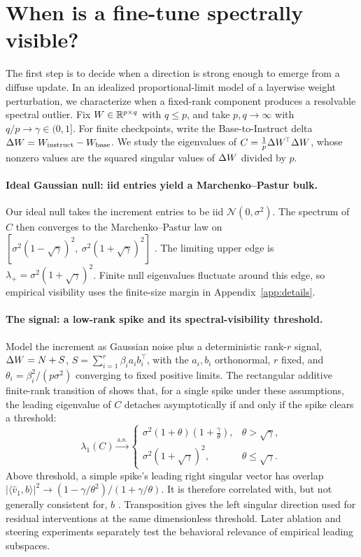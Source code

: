 \section{When is a fine-tune spectrally visible?}
\label{sec:theory}

The first step is to decide when a direction is strong enough to emerge from a
diffuse update. In an idealized proportional-limit model of a layerwise weight
perturbation, we characterize when a fixed-rank component produces a resolvable
spectral outlier.
Fix $W \in \mathbb{R}^{p \times q}$ with $q \le p$, and take
$p,q\to\infty$ with $q/p\to\gamma\in(0,1]$. For finite checkpoints, write the
Base-to-Instruct delta
$\Delta W = W_{\text{instruct}} - W_{\text{base}}$.
We study the eigenvalues of $C = \tfrac{1}{p}\Delta W^{\!\top}\Delta W$, whose nonzero
values are the squared singular values of $\Delta W$ divided by $p$.

\paragraph{Ideal Gaussian null: iid entries yield a Marchenko--Pastur bulk.}
Our ideal null takes the increment entries to be iid
$\mathcal N(0,\sigma^2)$. The spectrum of $C$ then converges to the
Marchenko--Pastur law on $[\sigma^2(1-\sqrt\gamma)^2,\ \sigma^2(1+\sqrt\gamma)^2]$
\citep{marchenko1967}. The limiting upper edge is
$\lambda_+ = \sigma^2(1+\sqrt\gamma)^2$. Finite null eigenvalues fluctuate around
this edge, so empirical visibility uses the finite-size margin in
Appendix~\ref{app:details}.

\paragraph{The signal: a low-rank spike and its spectral-visibility threshold.}
Model the increment as Gaussian noise plus a deterministic rank-$r$ signal,
$\Delta W = N + S$, $S = \sum_{i=1}^r \beta_i a_i b_i^{\!\top}$, with the $a_i,b_i$
orthonormal, $r$ fixed, and $\theta_i = \beta_i^2/(p\sigma^2)$ converging to fixed
positive limits. The rectangular additive finite-rank
transition of \citet{benaych2012} shows that, for a single spike under these
assumptions, the leading eigenvalue of $C$ detaches asymptotically if and only if
the spike clears a threshold:
\begin{equation}
\lambda_1(C) \xrightarrow{\text{a.s.}}
\begin{cases}
\sigma^2(1+\theta)\!\left(1+\tfrac{\gamma}{\theta}\right), & \theta > \sqrt\gamma,\\[1.2ex]
\sigma^2(1+\sqrt\gamma)^2, & \theta \le \sqrt\gamma.
\end{cases}
\label{eq:bbp}
\end{equation}
Above threshold, a simple spike's leading right singular vector has overlap
$|\langle \hat v_1, b\rangle|^2 \to (1-\gamma/\theta^2)/(1+\gamma/\theta)$.
It is therefore correlated with, but not generally consistent for, $b$
\citep{benaych2012}. Transposition gives the left singular direction used for
residual interventions at the same dimensionless threshold. Later ablation and
steering experiments separately test the behavioral relevance of empirical
leading subspaces.

